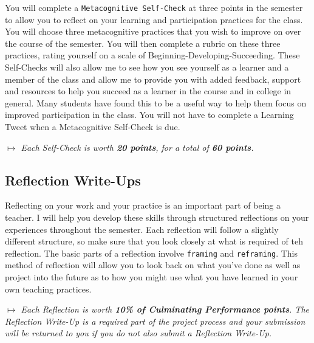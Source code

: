 \documentclass{tufte-handout}
\begin{document}
You will complete a \texttt{Metacognitive Self-Check} at three points in the semester to allow you to reflect on your learning and participation practices for the class. You will choose three metacognitive practices that you wish to improve on over the course of the semester. You will then complete a rubric on these three practices, rating yourself on a scale of Beginning-Developing-Succeeding. These Self-Checks will also allow me to see how you see yourself as a learner and a member of the class and allow me to provide you with added feedback, support and resources to help you succeed as a learner in the course and in college in general. Many students have found this to be a useful way to help them focus on improved participation in the class. You will not have to complete a Learning Tweet when a Metacognitive Self-Check is due.

\medskip\noindent\textit{$\mapsto$ Each Self-Check is worth \textbf{20 points}, for a total of \textbf{60 points}.}

\subsection{Reflection Write-Ups}

Reflecting on your work and your practice is an important part of being a teacher. I will help you develop these skills through structured reflections on your experiences throughout the semester. Each reflection will follow a slightly different structure, so make sure that you look closely at what is required of teh reflection. The basic parts of a reflection involve \texttt{framing} and \texttt{reframing}. This method of reflection will allow you to look back on what you've done as well as project into the future as to how you might use what you have learned in your own teaching practices.

\medskip\noindent\textit{$\mapsto$ Each Reflection is worth \textbf{10\% of Culminating Performance points}. The Reflection Write-Up is a required part of the project process and your submission will be returned to you if you do not also submit a Reflection Write-Up.}
\end{document}

